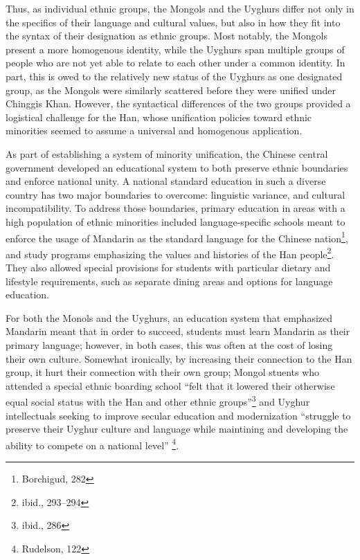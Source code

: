 Thus, as individual ethnic groups, the Mongols and the Uyghurs differ not only
in the specifics of their language and cultural values, but also in how they fit
into the syntax of their designation as ethnic groups. Most notably, the Mongols
present a more homogenous identity, while the Uyghurs span multiple groups of
people who are not yet able to relate to each other under a common identity. In
part, this is owed to the relatively new status of the Uyghurs as one designated
group, as the Mongols were similarly scattered before they were unified under
Chinggis Khan. However, the syntactical differences of the two groups provided a
logistical challenge for the Han, whose unification policies toward ethnic
minorities seemed to assume a universal and homogenous application.

\hrulefill

As part of establishing a system of minority unification, the Chinese central
government developed an educational system to both preserve ethnic boundaries
and enforce national unity. A national standard education in such a diverse
country has two major boundaries to overcome: linguistic variance, and cultural
incompatibility. To address those boundaries, primary education in areas with a
high population of ethnic minorities included language-specific schools meant to
enforce the usage of Mandarin as the standard language for the Chinese
nation\footnote{Borchigud, 282}, and study programs emphasizing the values and
histories of the Han people\footnote{ibid., 293--294}. They also allowed special
provisions for students with particular dietary and lifestyle requirements, such
as separate dining areas and options for language education.

For both the Monols and the Uyghurs, an education system that emphasized
Mandarin meant that in order to succeed, students must learn Mandarin as their
primary language; however, in both cases, this was often at the cost of losing
their own culture. Somewhat ironically, by increasing their connection to the
Han group, it hurt their connection with their own group; Mongol stuents who
attended a special ethnic boarding school ``felt that it lowered their otherwise
equal social status with the Han and other ethnic groups''\footnote{ibid., 286}
and Uyghur intellectuals seeking to improve secular education and modernization
``struggle to preserve their Uyghur culture and language while maintining and
developing the ability to compete on a national level'' \footnote{Rudelson,
122}.


